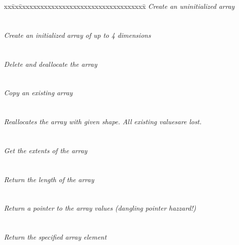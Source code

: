 \documentclass{article}
\begin{document}
\begin{tabbing}
xx\=xx\=xxxxxxxxxxxxxxxxxxxxxxxxxxxxxxxxxxx\= \kill
\> \todo \> \textit{Create an uninitialized array} \\
\>       \>  \\ \\
\> \todo \> \textit{Create an initialized array of up to 4 dimensions} \\
\>       \>  \\ \\
\> \todo \> \textit{Delete and deallocate the array} \\
\>       \>   \\ \\
\> \todo \> \textit{Copy an existing array} \\
\>       \>   \\ \\
\> \todo \> \textit{Reallocates the array with given shape.  All existing valuesare lost.} \\
\>       \>    \\ \\
\> \todo \> \textit{Get the extents of the array} \\
\>       \>   \\ \\
\> \todo \> \textit{Return the length of the array} \\
\>       \>   \\ \\
\> \todo \> \textit{Return a pointer to the array values (dangling pointer hazzard!)} \\
\>       \>   \\ \\
\> \todo \> \textit{Return the specified array element} \\
\>       \> 
\end{tabbing}
\end{document}
